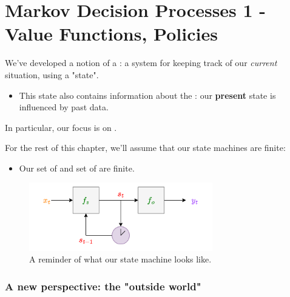 \setcounter{chapter}{10-1} %

\chapter{Markov Decision Processes 1 - Value Functions, Policies}

\setcounter{section}{0}

    We've developed a notion of a : a system for keeping track of our \textit{current} situation, using a "state".

    \begin{itemize}
        \item This state also contains information about the : our \textbf{present} state is influenced by past data.
    \end{itemize}

    In particular, our focus is on . \\

    \begin{clarification}
        For the rest of this chapter, we'll assume that our state machines are finite:

        \begin{itemize}
            \item Our set of  and set of  are finite.
        \end{itemize}
    \end{clarification}

    \begin{figure}[H]
        \centering
        \includegraphics[width=80mm,scale=0.5]{images/rnn_images/state_machine_diagram.png}
        
        \caption*{A reminder of what our state machine looks like.}
    \end{figure}
    


    \phantom{}

    \subsection{A new perspective: the "outside world"}

